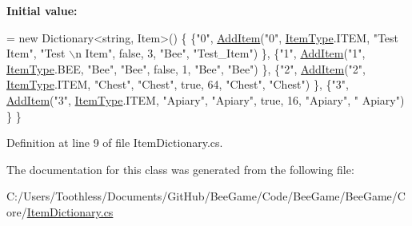 {\bfseries Initial value\+:}
\begin{DoxyCode}
= \textcolor{keyword}{new} Dictionary<string, Item>()
        \{
            \{\textcolor{stringliteral}{"0"}, \hyperlink{class_bee_game_1_1_core_1_1_item_dictionary_aa74683c6433f643da6967e10862ac026}{AddItem}(\textcolor{stringliteral}{"0"}, \hyperlink{namespace_bee_game_1_1_enums_aa1fa1a04627915b8e72d3bb1c5c3fa82}{ItemType}.ITEM, \textcolor{stringliteral}{"Test Item"}, \textcolor{stringliteral}{"Test \(\backslash\)n Item"}, \textcolor{keyword}{false}, 3, \textcolor{stringliteral}{"Bee"}, \textcolor{stringliteral}{
      "Test\_Item"}) \},
            \{\textcolor{stringliteral}{"1"}, \hyperlink{class_bee_game_1_1_core_1_1_item_dictionary_aa74683c6433f643da6967e10862ac026}{AddItem}(\textcolor{stringliteral}{"1"}, \hyperlink{namespace_bee_game_1_1_enums_aa1fa1a04627915b8e72d3bb1c5c3fa82}{ItemType}.BEE, \textcolor{stringliteral}{"Bee"}, \textcolor{stringliteral}{"Bee"}, \textcolor{keyword}{false}, 1, \textcolor{stringliteral}{"Bee"}, \textcolor{stringliteral}{"Bee"}) \},
            \{\textcolor{stringliteral}{"2"}, \hyperlink{class_bee_game_1_1_core_1_1_item_dictionary_aa74683c6433f643da6967e10862ac026}{AddItem}(\textcolor{stringliteral}{"2"}, \hyperlink{namespace_bee_game_1_1_enums_aa1fa1a04627915b8e72d3bb1c5c3fa82}{ItemType}.ITEM, \textcolor{stringliteral}{"Chest"}, \textcolor{stringliteral}{"Chest"}, \textcolor{keyword}{true}, 64, \textcolor{stringliteral}{"Chest"}, \textcolor{stringliteral}{"Chest"}) 
      \},
            \{\textcolor{stringliteral}{"3"}, \hyperlink{class_bee_game_1_1_core_1_1_item_dictionary_aa74683c6433f643da6967e10862ac026}{AddItem}(\textcolor{stringliteral}{"3"}, \hyperlink{namespace_bee_game_1_1_enums_aa1fa1a04627915b8e72d3bb1c5c3fa82}{ItemType}.ITEM, \textcolor{stringliteral}{"Apiary"}, \textcolor{stringliteral}{"Apiary"}, \textcolor{keyword}{true}, 16, \textcolor{stringliteral}{"Apiary"}, \textcolor{stringliteral}{"
      Apiary"}) \}
        \}
\end{DoxyCode}


Definition at line 9 of file Item\+Dictionary.\+cs.



The documentation for this class was generated from the following file\+:\begin{DoxyCompactItemize}
\item 
C\+:/\+Users/\+Toothless/\+Documents/\+Git\+Hub/\+Bee\+Game/\+Code/\+Bee\+Game/\+Bee\+Game/\+Core/\hyperlink{_item_dictionary_8cs}{Item\+Dictionary.\+cs}\end{DoxyCompactItemize}
